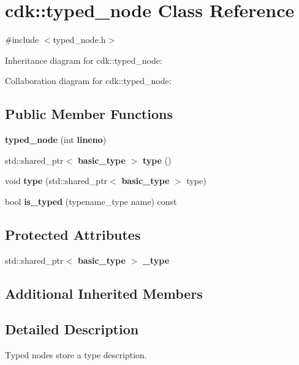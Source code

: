 \section{cdk\+:\+:typed\+\_\+node Class Reference}
\label{classcdk_1_1typed__node}


{\ttfamily \#include $<$typed\+\_\+node.\+h$>$}



Inheritance diagram for cdk\+:\+:typed\+\_\+node\+:


Collaboration diagram for cdk\+:\+:typed\+\_\+node\+:
\subsection*{Public Member Functions}
\begin{DoxyCompactItemize}
\item 
\textbf{ typed\+\_\+node} (int \textbf{ lineno})
\item 
\mbox{\label{classcdk_1_1typed__node_aea3e1879c6f33461d43e0780a106d742}} 
std\+::shared\+\_\+ptr$<$ \textbf{ basic\+\_\+type} $>$ {\bfseries type} ()
\item 
\mbox{\label{classcdk_1_1typed__node_aeb285878c229710ed4f4973ffdc7f3fb}} 
void {\bfseries type} (std\+::shared\+\_\+ptr$<$ \textbf{ basic\+\_\+type} $>$ type)
\item 
\mbox{\label{classcdk_1_1typed__node_aa3790f1e60b668f720882380b2f0cc82}} 
bool {\bfseries is\+\_\+typed} (typename\+\_\+type name) const
\end{DoxyCompactItemize}
\subsection*{Protected Attributes}
\begin{DoxyCompactItemize}
\item 
\mbox{\label{classcdk_1_1typed__node_a6431a8d34b0e8fadfcb15d0e5f5f5be0}} 
std\+::shared\+\_\+ptr$<$ \textbf{ basic\+\_\+type} $>$ {\bfseries \+\_\+type}
\end{DoxyCompactItemize}
\subsection*{Additional Inherited Members}


\subsection{Detailed Description}
Typed nodes store a type description. 

